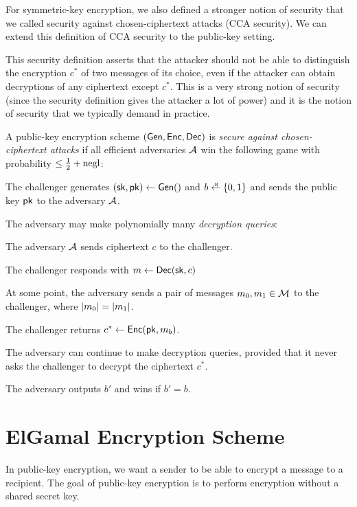For symmetric-key encryption, we also defined
a stronger notion of security that we called
security against chosen-ciphertext attacks (CCA security).
We can extend this definition of CCA security
to the public-key setting.

This security definition asserts that the attacker should not be
able to distinguish the encryption $c^*$ of two messages of its choice,
even if the attacker can obtain decryptions of any ciphertext except
$c^*$.
This is a very strong notion of security (since the security definition
gives the attacker a lot of power) and it is the notion of security
that we typically demand in practice.

\begin{definition}
  A public-key encryption scheme $(\mathsf{Gen}, \mathsf{Enc}, \mathsf{Dec})$ is \emph{secure against chosen-ciphertext attacks}
  if all efficient adversaries $\mathcal{A}$ 
  win the following game with probability $\leq \tfrac{1}{2} + \operatorname{negl}$:
\begin{compactitem}
\item The challenger generates $({\mathsf{sk}}, \mathsf{pk}) \gets \mathsf{Gen}()$ and $b \getsr \bin$ and sends 
  the public key $\mathsf{pk}$ to the adversary $\mathcal{A}$.
\item The adversary may make polynomially many \emph{decryption queries}:
    \begin{compactitem}
    \item The adversary $\mathcal{A}$ sends ciphertext $c$ to the challenger.
    \item The challenger responds with $m \gets \mathsf{Dec}({\mathsf{sk}}, c)$		
    \end{compactitem}
\item At some point, the adversary sends a pair of messages $m_0, m_1 \in \mathcal{M}$
  to the challenger, where $\left| m_0 \right|=\left| m_1 \right|$.
\item The challenger returns $c^* \gets \mathsf{Enc}(\mathsf{pk}, m_b)$.
\item The adversary can continue to make decryption queries, provided that
      it never asks the challenger to decrypt the ciphertext $c^*$.
\item The adversary outputs $b'$ and wins if $b' = b$.
\end{compactitem}
\end{definition}

\section{ElGamal Encryption Scheme}
In public-key encryption, we want a sender to be able to encrypt a message
to a recipient.
The goal of public-key encryption is to perform encryption without a shared secret key.

